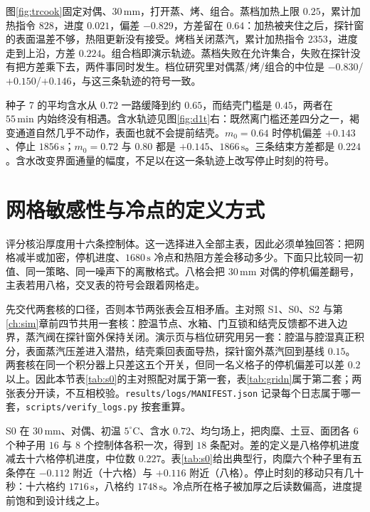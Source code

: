 图\ref{fig:trcook}{}固定对偶、\(30\,\mathrm{mm}\)，打开蒸、烤、组合。蒸档加热上限 \(0.25\)，累计加热指令 \(828\)，进度 \(0.021\)，偏差 \(-0.829\)，方差留在 \(0.64\)：加热被夹住之后，探针窗的表面温差不够，热阻更新没有接受。烤档关闭蒸汽，累计加热指令 \(2353\)，进度走到上沿，方差 \(0.224\)。组合档即演示轨迹。蒸档失败在允许集合，失败在探针没有把方差乘下去，两件事同时发生。档位研究里对偶蒸/烤/组合的中位是 \(-0.830\)/\(+0.150\)/\(+0.146\)，与这三条轨迹的符号一致。

种子 7 的平均含水从 \(0.72\) 一路缓降到约 \(0.65\)，而结壳门槛是 \(0.45\)，两者在 \(55\,\mathrm{min}\) 内始终没有相遇。含水轨迹见图\ref{fig:d1t}{}右：既然离门槛还差四分之一，褐变通道自然几乎不动作，表面也就不会提前结壳。\(m_0=0.64\) 时停机偏差 \(+0.143\)、停止 \(1856\,\mathrm{s}\)；\(m_0=0.72\) 与 \(0.80\) 都是 \(+0.145\)、\(1866\,\mathrm{s}\)。三条结束方差都是 \(0.224\)。含水改变界面通量的幅度，不足以在这一条轨迹上改写停止时刻的符号。

\section{网格敏感性与冷点的定义方式}
\label{ch:grid}

评分核沿厚度用十六条控制体。这一选择进入全部主表，因此必须单独回答：把网格减半或加密，停机进度、\(1680\,\mathrm{s}\) 冷点和热阻方差会移动多少。下面只比较同一初值、同一策略、同一噪声下的离散格式。八格会把 \(30\,\mathrm{mm}\) 对偶的停机偏差翻号，主表若用八格，交叉表的符号会跟着网格走。

先交代两套核的口径，否则本节两张表会互相矛盾。主对照 S1、S0、S2 与第\ref{ch:sim}{}章前四节共用一套核：腔温节点、水箱、门互锁和结壳反馈都不进入边界，蒸汽阀在探针窗外保持关闭。演示页与档位研究用另一套：腔温与腔湿真正积分，表面蒸汽压差进入潜热，结壳乘回表面导热，探针窗外蒸汽回到基线 \(0.15\)。两套核在同一个积分器上只差这五个开关，但同一名义格子的停机偏差可以差 \(0.2\) 以上。因此本节表\ref{tab:s0}{}的主对照配对属于第一套，表\ref{tab:gridn}{}属于第二套；两张表分开读，不互相校验。\texttt{results/logs/MANIFEST.json} 记录每个日志属于哪一套，\texttt{scripts/verify\_logs.py} 按套重算。

S0 在 \(30\,\mathrm{mm}\)、对偶、初温 \(5^\circ\mathrm{C}\)、含水 \(0.72\)、均匀场上，把肉糜、土豆、面团各 \(6\) 个种子用 \(16\) 与 \(8\) 个控制体各积一次，得到 \(18\) 条配对。差的定义是八格停机进度减去十六格停机进度，中位数 \(0.227\)。表\ref{tab:s0}{}给出典型行，肉糜六个种子里有五条停在 \(-0.112\) 附近（十六格）与 \(+0.116\) 附近（八格）。停止时刻的移动只有几十秒：十六格约 \(1716\,\mathrm{s}\)，八格约 \(1748\,\mathrm{s}\)。冷点所在格子被加厚之后读数偏高，进度提前饱和到设计线之上。

